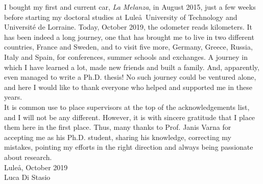 I bought my first and current car, \emph{La Melanza}, in August 2015, just a few weeks before starting my doctoral studies at Lule\aa\ University of Technology and Universit\'e de Lorraine. Today, October 2019, the odometer reads kilometers. It has been indeed a long journey, one that has brought me to live in two different countries, France and Sweden, and to visit five more, Germany, Greece, Russia, Italy and Spain, for conferences, summer schools and exchanges. A journey in which I have learned a lot, made new friends and built a family. And, apparently, even managed to write a Ph.D. thesis! No such journey could be ventured alone, and here I would like to thank everyone who helped and supported me in these years.\\
It is common use to place supervisors at the top of the acknowledgements list, and I will not be any different. However, it is with sincere gratitude that I place them here in the first place. Thus, many thanks to Prof. Janis Varna for accepting me as his Ph.D. student, sharing his knowledge, correcting my mistakes, pointing my efforts in the right direction and always being passionate about research.\\[2.5cm]
Lule\aa, October 2019\\
Luca Di Stasio
